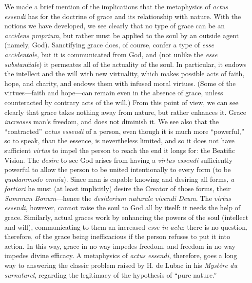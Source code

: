 We made a brief mention of the implications that the metaphysics of \emph{actus essendi} has for the doctrine of grace and its relationship with nature. With the notions we have developed, we see clearly that no type of grace can be an \emph{accidens proprium}, but rather must be applied to the soul by an outside agent (namely, God).
Sanctifying grace does, of course, confer a type of \emph{esse accidentale}, but it is communicated from God, and (not unlike the \emph{esse substantiale}) it permeates all of the actuality of the soul.
In particular, it endows the intellect and the will with new virtuality, which makes possible acts of faith, hope, and charity, and endows them with infused moral virtues.
(Some of the virtues—faith and hope—can remain even in the absence of grace, unless counteracted by contrary acts of the will.)
From this point of view, we can see clearly that grace takes nothing away from nature, but rather enhances it.
Grace \emph{increases} man’s freedom, and does not diminish it.
We see also that the “contracted” \emph{actus essendi} of a person, even though it is much more “powerful,” so to speak, than the essence, is nevertheless limited, and so it does not have sufficient \emph{virtus} to impel the person to reach the end it longs for: the Beatific Vision.
The \emph{desire} to see God arises from having a \emph{virtus essendi} sufficiently powerful to allow the person to be united intentionally to every form (to be \emph{quodammodo omnia}). Since man is capable knowing and desiring all forms, \emph{a fortiori} he must (at least implicitly) desire the Creator of those forms, their \emph{Summum Bonum}—hence the \emph{desiderium naturale vivendi Deum}.
The \emph{virtus essendi}, however, cannot raise the soul to God all by itself: it needs the help of grace. Similarly, actual graces work by enhancing the powers of the soul (intellect and will), communicating to them an increased \emph{esse in actu}; there is no question, therefore, of the grace being inefficacious if the person refuses to put it into action. In this way, grace in no way impedes freedom, and freedom in no way impedes divine efficacy.
A metaphysics of \emph{actus essendi}, therefore, goes a long way to answering the classic problem raised by H. de Lubac in his \emph{Mystère du surnaturel}, regarding the legitimacy of the hypothesis of “pure nature.”\,%
%
